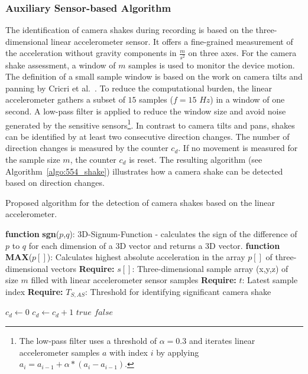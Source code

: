 \subsubsection{Auxiliary Sensor-based Algorithm}
The identification of camera shakes during recording is based on the three-dimensional linear accelerometer sensor.
It offers a fine-grained measurement of the acceleration without gravity components in $\frac{m}{s^2}$ on three axes. 
For the camera shake assessment, a window of $m$ samples is used to monitor the device motion.
The definition of a small sample window is based on the work on camera tilts and panning by Cricri et al.~\cite{Cricri2012}. 
To reduce the computational burden, the linear accelerometer gathers a subset of $15$ samples ($f=15$ $\unit{Hz}$) in a window of one second.
A low-pass filter is applied to reduce the window size and avoid noise generated by the sensitive sensors\footnote{The low-pass filter uses a threshold of $\alpha = 0.3$ and iterates linear accelerometer samples $a$ with index $i$ by applying $a_i=a_{i-1} + \alpha * (a_{i} - a_{i-1} )$.}.
In contrast to camera tilts and pans, shakes can be identified by at least two consecutive direction changes. 
The number of direction changes is measured by the counter $c_{d}$. 
If no movement is measured for the sample size $m$, the counter $c_{d}$ is reset. 
The resulting algorithm (see Algorithm~\ref{algo:554_shake}) illustrates how a camera shake can be detected based on direction changes.

\begin{algorithm}[!h]
	\caption{Proposed algorithm for the detection of camera shakes based on the linear accelerometer.}
	\begin{algorithmic}
		
		\Require \textbf{function} \textbf{sgn}($p$,$q$): 3D-Signum-Function - calculates the sign of the difference of $p$ to $q$ for each dimension of a 3D vector and returns a 3D vector.
		\Require \textbf{function} \textbf{MAX}($p[]$): Calculates highest absolute acceleration in the array $p[]$ of three-dimensional vectors
		\Require \textbf{Require:} $s[]$: Three-dimensional sample array (x,y,z) of size $m$ filled with linear accelerometer sensor samples
		\Require \textbf{Require:} $t$: Latest sample index
		\Require \textbf{Require:} $T_{S,AS}$: Threshold for identifying significant camera shake
		
		\State $c_{d} \gets 0 $
		\State 	$c_{d} \gets c_{d} + 1 $
		\EndIf
		\EndFor
		\State \Return $true$
		\EndIf 
		\EndIf
		\State \Return $false$
	\end{algorithmic}
	\label{algo:554_shake}
\end{algorithm}

